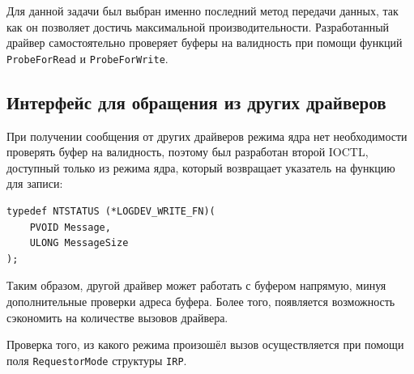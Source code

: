 Для данной задачи был выбран именно последний метод передачи данных, так как он позволяет достичь максимальной производительности. Разработанный драйвер самостоятельно проверяет буферы на валидность при помощи функций \texttt{ProbeForRead} и \texttt{ProbeForWrite}.

\subsection{Интерфейс для обращения из других драйверов}

При получении сообщения от других драйверов режима ядра нет необходимости проверять буфер на валидность, поэтому был разработан второй IOCTL, доступный только из режима ядра, который возвращает указатель на функцию для записи:
\begin{lstlisting}
typedef NTSTATUS (*LOGDEV_WRITE_FN)(
    PVOID Message,
    ULONG MessageSize
);
\end{lstlisting}

Таким образом, другой драйвер может работать с буфером напрямую, минуя дополнительные проверки адреса буфера. Более того, появляется возможность сэкономить на количестве вызовов драйвера.

Проверка того, из какого режима произошёл вызов осуществляется при помощи поля \texttt{RequestorMode} структуры \texttt{IRP}.
